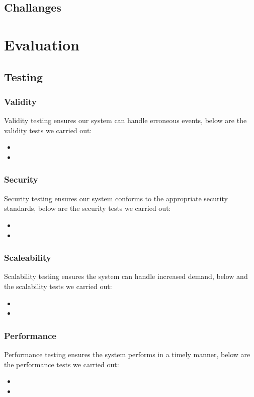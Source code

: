 \documentclass[11pt]{article}
\begin{document}
\subsection{Challanges}

\section{Evaluation}
\subsection{Testing}
\subsubsection{Validity}
Validity testing ensures our system can handle erroneous events, below are the validity tests we carried out:
\begin{itemize}
\item
\item
\end{itemize}
\subsubsection{Security}
Security testing ensures our system conforms to the appropriate security standards, below are the security tests we carried out:
\begin{itemize}
\item
\item
\end{itemize}
\subsubsection{Scaleability}
Scalability testing ensures the system can handle increased demand, below and the scalability tests we carried out:
\begin{itemize}
\item
\item
\end{itemize}
\subsubsection{Performance}
Performance testing ensures the system performs in a timely manner, below are the performance tests we carried out: 
\begin{itemize}
\item
\item
\end{itemize}
\end{document}
